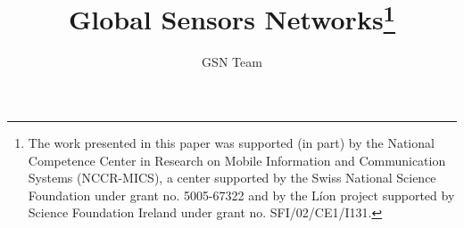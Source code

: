 \documentclass[a4paper,oneside,10pt]{book}
\title{Global Sensors Networks\thanks{The work presented in this paper was supported (in
    part) by the National Competence Center in Research on Mobile Information
    and Communication Systems (NCCR-MICS), a center supported by the Swiss
    National Science Foundation under grant no. 5005-67322 and by the L\'ion
    project supported by Science Foundation Ireland under grant no.
    SFI/02/CE1/I131.}}
\author{GSN Team}
\begin{document}
	\maketitle
	\tableofcontents	
	
	
	
	\listoffigures
	\listoftables	
	\lstlistoflistings
	
	\appendix
	
	
	
	
%	
\end{document}
